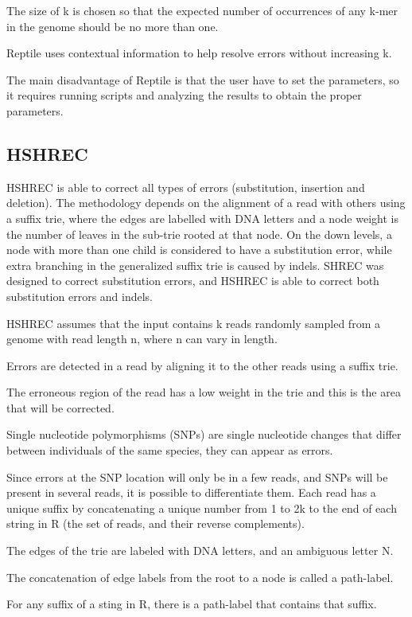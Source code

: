 \documentclass{llncs}
\begin{document}
The size of k is chosen so that the expected number of occurrences of any
k-mer in the genome should be no more than one.


Reptile uses contextual information to help resolve errors without increasing k.


The main disadvantage of Reptile is that the user have to set the parameters, so it
requires running scripts and analyzing the results to obtain the proper parameters.

\subsection{HSHREC}
HSHREC \cite{HShrec} is able to correct all types of errors (substitution, insertion and deletion). The methodology depends on the alignment of a read with others using a suffix trie, where the edges are labelled with DNA letters and a node weight is the number of leaves in the sub-trie rooted at that node. On the down levels, a node with more than one child is considered to have a substitution error, while extra branching in the generalized suffix trie is caused by indels.
SHREC was designed to correct substitution errors, and HSHREC is able to correct both substitution errors and indels.

HSHREC assumes that the input contains k reads randomly sampled from a genome with read length n, where n can vary in length. 

Errors are detected in a read by aligning it to the other reads using a suffix trie.

The erroneous region of the read has a low weight in the trie and this is the area that will be corrected.

Single nucleotide polymorphisms (SNPs) are single nucleotide changes that differ between individuals of the same species, they can appear as errors. 

Since errors at the SNP location will only be in a few reads, and SNPs will be present in several reads, it is possible to differentiate them.
Each read has a unique suffix by concatenating a unique number from 1 to 2k to the end of each string in R (the set of reads, and their reverse complements). 

The edges of the trie are labeled with DNA letters, and an ambiguous letter N.

The concatenation of edge labels from the root to a node is called a path-label. 

For any suffix of a sting in R, there is a path-label that contains that suffix. 
\end{document}
